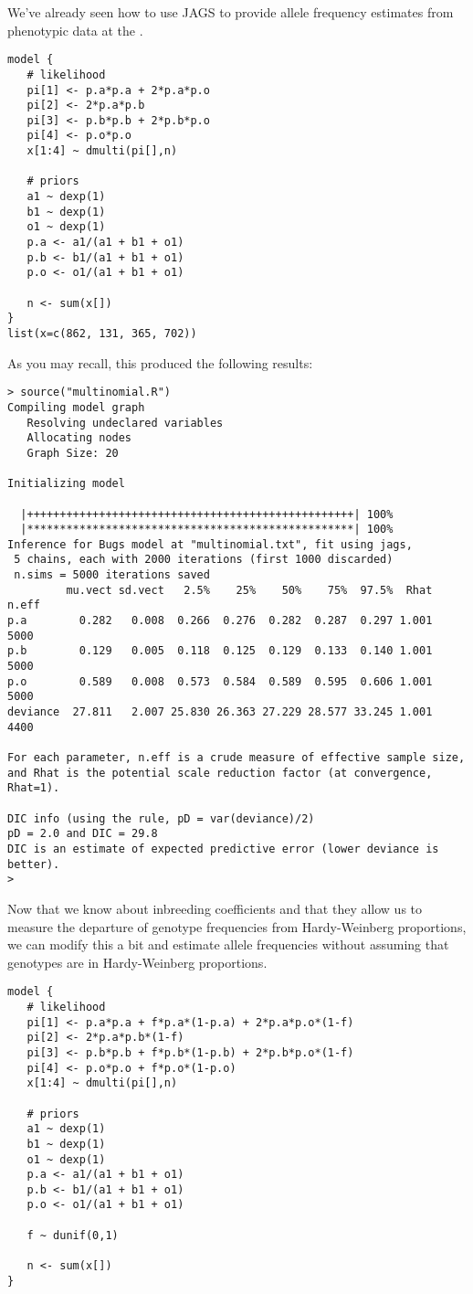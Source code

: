 We've already seen how to use JAGS to provide allele frequency
estimates from phenotypic data at the .
\begin{verbatim}
model {
   # likelihood
   pi[1] <- p.a*p.a + 2*p.a*p.o
   pi[2] <- 2*p.a*p.b
   pi[3] <- p.b*p.b + 2*p.b*p.o
   pi[4] <- p.o*p.o
   x[1:4] ~ dmulti(pi[],n)

   # priors
   a1 ~ dexp(1)
   b1 ~ dexp(1)
   o1 ~ dexp(1)
   p.a <- a1/(a1 + b1 + o1)
   p.b <- b1/(a1 + b1 + o1)
   p.o <- o1/(a1 + b1 + o1)

   n <- sum(x[])
}
list(x=c(862, 131, 365, 702))
\end{verbatim}
As you may recall, this produced the following results:
\begin{verbatim}
> source("multinomial.R")
Compiling model graph
   Resolving undeclared variables
   Allocating nodes
   Graph Size: 20

Initializing model

  |++++++++++++++++++++++++++++++++++++++++++++++++++| 100%
  |**************************************************| 100%
Inference for Bugs model at "multinomial.txt", fit using jags,
 5 chains, each with 2000 iterations (first 1000 discarded)
 n.sims = 5000 iterations saved
         mu.vect sd.vect   2.5%    25%    50%    75%  97.5%  Rhat n.eff
p.a        0.282   0.008  0.266  0.276  0.282  0.287  0.297 1.001  5000
p.b        0.129   0.005  0.118  0.125  0.129  0.133  0.140 1.001  5000
p.o        0.589   0.008  0.573  0.584  0.589  0.595  0.606 1.001  5000
deviance  27.811   2.007 25.830 26.363 27.229 28.577 33.245 1.001  4400

For each parameter, n.eff is a crude measure of effective sample size,
and Rhat is the potential scale reduction factor (at convergence, Rhat=1).

DIC info (using the rule, pD = var(deviance)/2)
pD = 2.0 and DIC = 29.8
DIC is an estimate of expected predictive error (lower deviance is better).
>
\end{verbatim}
Now that we know about inbreeding coefficients and that they allow us
to measure the departure of genotype frequencies from Hardy-Weinberg
proportions, we can modify this a bit and estimate allele frequencies
without assuming that genotypes are in Hardy-Weinberg proportions.
\begin{verbatim}
model {
   # likelihood
   pi[1] <- p.a*p.a + f*p.a*(1-p.a) + 2*p.a*p.o*(1-f)
   pi[2] <- 2*p.a*p.b*(1-f)
   pi[3] <- p.b*p.b + f*p.b*(1-p.b) + 2*p.b*p.o*(1-f)
   pi[4] <- p.o*p.o + f*p.o*(1-p.o)
   x[1:4] ~ dmulti(pi[],n)

   # priors
   a1 ~ dexp(1)
   b1 ~ dexp(1)
   o1 ~ dexp(1)
   p.a <- a1/(a1 + b1 + o1)
   p.b <- b1/(a1 + b1 + o1)
   p.o <- o1/(a1 + b1 + o1)

   f ~ dunif(0,1)

   n <- sum(x[])
}
\end{verbatim}

